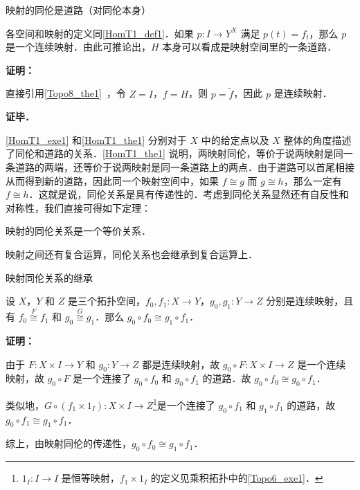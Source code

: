 \begin{theorem}{映射的同伦是道路（对同伦本身）}\label{HomT1_the1}

各空间和映射的定义同\autoref{HomT1_def1}．如果 $p:I\rightarrow Y^X$ 满足 $p(t)=f_t$，那么 $p$ 是一个连续映射．由此可推论出，$H$ 本身可以看成是映射空间里的一条道路．

\end{theorem}

\textbf{证明：}

直接引用\autoref{Topo8_the1}~，令 $Z=I$，$f=H$，则 $p=\widetilde{f}$，因此 $p$ 是连续映射．

\textbf{证毕．}

\autoref{HomT1_exe1} 和\autoref{HomT1_the1} 分别对于 $X$ 中的给定点以及 $X$ 整体的角度描述了同伦和道路的关系．\autoref{HomT1_the1} 说明，两映射同伦，等价于说两映射是同一条道路的两端，还等价于说两映射是同一条道路上的两点．由于道路可以首尾相接从而得到新的道路，因此同一个映射空间中，如果 $f\cong g$ 而 $g\cong h$，那么一定有 $f\cong h$．这就是说，同伦关系是具有传递性的．考虑到同伦关系显然还有自反性和对称性，我们直接可得如下定理：

\begin{theorem}{}
映射的同伦关系是一个等价关系．
\end{theorem}

映射之间还有复合运算，同伦关系也会继承到复合运算上．

\begin{theorem}{映射同伦关系的继承}\label{HomT1_the2}

设 $X$，$Y$ 和 $Z$ 是三个拓扑空间，$f_0, f_1:X\rightarrow Y$，$g_0, g_1:Y\rightarrow Z$ 分别是连续映射，且有 $f_0\overset{F}{\cong}f_1$ 和 $g_0\overset{G}{\cong}g_1$．那么 $g_0\circ f_0\cong g_1\circ f_1$．

\end{theorem}

\textbf{证明：}

由于 $F:X\times I\rightarrow Y$ 和 $g_0:Y\rightarrow Z$ 都是连续映射，故 $g_0\circ F:X\times I\rightarrow Z$ 是一个连续映射，故 $g_0\circ F$ 是一个连接了 $g_0\circ f_0$ 和 $g_0\circ f_1$ 的道路．故 $g_0\circ f_0\cong g_0\circ f_1$．

类似地，$G \circ (f_1 \times 1_I): X \times I \rightarrow Z$\footnote{$1_I:I\rightarrow I$ 是恒等映射，$f_1 \times 1_I$ 的定义见乘积拓扑中的\autoref{Topo6_exe1}．}是一个连接了 $g_0 \circ f_1$ 和 $g_1\circ f_1$ 的道路，故 $g_0 \circ f_1\cong g_1 \circ f_1$．

综上，由映射同伦的传递性，$g_0 \circ f_0\cong g_1 \circ f_1$．

